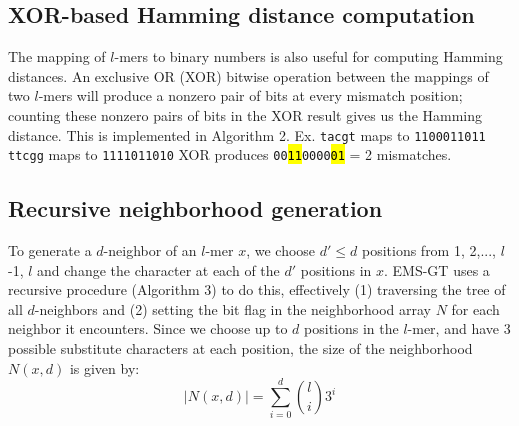 \documentclass[oneside,12pt]{DISCSthesis}
\begin{document}
		\subsection{XOR-based Hamming distance computation}
			The mapping of $l$-mers to binary numbers  is also useful for computing Hamming distances. An exclusive OR (XOR) bitwise operation between the mappings of two $l$-mers will produce a nonzero pair of bits at every mismatch position; counting these nonzero pairs of bits in the XOR result gives us the Hamming distance. This is implemented in Algorithm 2.\newline
			\hspace*{40pt} {\small Ex.	\texttt{tacgt} maps to \texttt{1100011011} \newline
				\vspace*{2pt}\hspace*{62pt} \texttt{ttcgg} maps to \texttt{1111011010} \newline				
				\hspace*{62pt}	XOR produces \hspace*{3pt}\texttt{00\hl{11}0000\hl{01}} = 2 mismatches.}

		\subsection{Recursive neighborhood generation}
			To generate a $d$-neighbor of an $l$-mer $x$, we choose $d' \leq d$ positions from 1, 2,..., $l$-1, $l$ and change the character at each of the $d'$ positions in $x$. EMS-GT uses a recursive procedure (Algorithm 3) to do this, effectively (1) traversing the tree of all $d$-neighbors and (2) setting the bit flag in the neighborhood array $N$ for each neighbor it encounters. Since we choose up to $d$ positions in the $l$-mer, and have 3 possible substitute characters at each position, the size of the neighborhood $N(x,d)$ is given by: %
			\begin{equation}
				|N(x,d)| = \sum_{i=0}^d \binom{l}{i} 3^{i}
			\end{equation}
\end{document}
